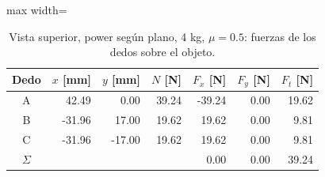 \begin{table}[H]
\centering

\begin{adjustbox}{max width=\textwidth}
\begin{tabular}{|c|r|r|r|r|r|r|}
\hline
\textbf{Dedo} & \textbf{$x$ [mm]} & \textbf{$y$ [mm]} & \textbf{$N$ [N]} & \textbf{$F_x$ [N]} & \textbf{$F_y$ [N]} & \textbf{$F_t$ [N]} \\ \hline
A & 42.49 & 0.00 & 39.24 & -39.24 & 0.00 & 19.62 \\ \hline
B & -31.96 & 17.00 & 19.62 & 19.62 & 0.00 & 9.81 \\ \hline
C & -31.96 & -17.00 & 19.62 & 19.62 & 0.00 & 9.81 \\ \hline
$\Sigma$ &  &  &  & 0.00 & 0.00 & 39.24 \\ \hline
\end{tabular}
\end{adjustbox}
\caption{Vista superior, power según plano, 4 kg, $\mu = 0.5$: fuerzas de los dedos sobre el objeto.}
\label{tab:superior}
\end{table}